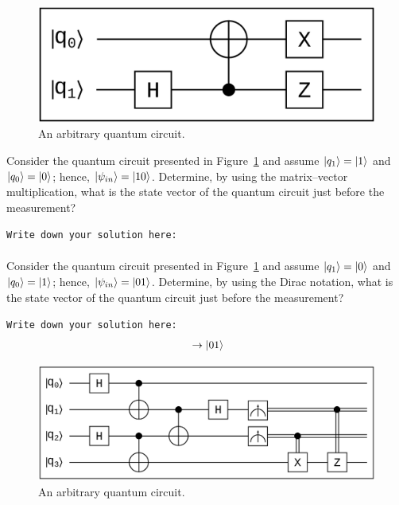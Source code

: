 \begin{figure}[t]
  \centerline{\includegraphics[scale=0.25]{img/qci_a3_question4.ps}}
  \caption{An arbitrary quantum circuit.}
  \label{fig:circuit2}
\end{figure}

\begin{question}
Consider the quantum circuit presented in Figure~\ref{fig:circuit2} and assume $\ket{q_{1}} = \ket{1}$ and $\ket{q_{0}} = \ket{0}$; hence, $\ket{\psi_{in}} = \ket{10}$. Determine, by using the matrix--vector multiplication, what is the state vector of the quantum circuit just before the measurement?
\label{qst:assignment3_4}
\end{question}
{\small
\texttt{Write down your solution here:}
\begin{equation*}
  \begin{split}
  \end{split}
\end{equation*}}
\vspace{0.1cm}

\begin{question}
Consider the quantum circuit presented in Figure~\ref{fig:circuit2} and assume $\ket{q_{1}} = \ket{0}$ and $\ket{q_{0}} = \ket{1}$; hence, $\ket{\psi_{in}} = \ket{01}$. Determine, by using the Dirac notation, what is the state vector of the quantum circuit just before the measurement?
\label{qst:assignment3_5}
\end{question}
{\small
\texttt{Write down your solution here:}
\begin{equation*}
  \begin{split}
      &\rightarrow \ket{01} \\
  \end{split}
\end{equation*}}
\vspace{0.1cm}

\begin{figure}[t]
  \centerline{\includegraphics[scale=0.25]{img/qci_a3_question6.ps}}
  \caption{An arbitrary quantum circuit.}
  \label{fig:circuit3}
\end{figure}

